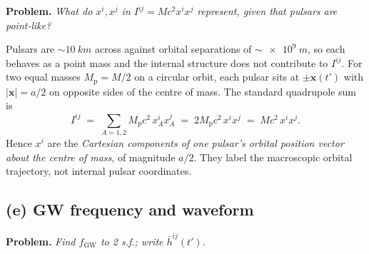 \documentclass[11pt]{article}
\begin{document}
\textbf{Problem.} \emph{What do $x^i, x^j$ in $I^{ij} = M c^2 x^i x^j$ represent, given that pulsars are point-like?}

Pulsars are $\sim\!\SI{10}{km}$ across against orbital separations of $\sim\!\SI{e9}{m}$, so each behaves as a point mass and the internal structure does not contribute to $I^{ij}$. For two equal masses $M_{\mathrm p} = M/2$ on a circular orbit, each pulsar sits at $\pm\bm x(t')$ with $|\bm x| = a/2$ on opposite sides of the centre of mass. The standard quadrupole sum is
\[
I^{ij} \;=\; \sum_{A=1,2} M_{\mathrm p} c^2\,x_A^i x_A^j \;=\; 2 M_{\mathrm p}c^2\,x^i x^j \;=\; M c^2\,x^i x^j.
\]
Hence $x^i$ are the \emph{Cartesian components of one pulsar's orbital position vector about the centre of mass}, of magnitude $a/2$. They label the macroscopic orbital trajectory, not internal pulsar coordinates.

\subsection*{(e) GW frequency and waveform}

\textbf{Problem.} \emph{Find $f_{\mathrm{GW}}$ to 2 s.f.; write $\bar h^{ij}(t')$.}
\end{document}
